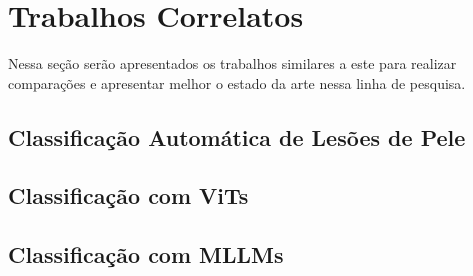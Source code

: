 \chapter{Trabalhos Correlatos}

Nessa seção serão apresentados os trabalhos similares a este para realizar comparações e apresentar melhor o estado da arte nessa linha de pesquisa.

\section{Classificação Automática de Lesões de Pele}

\section{Classificação com ViTs}

\section{Classificação com MLLMs}